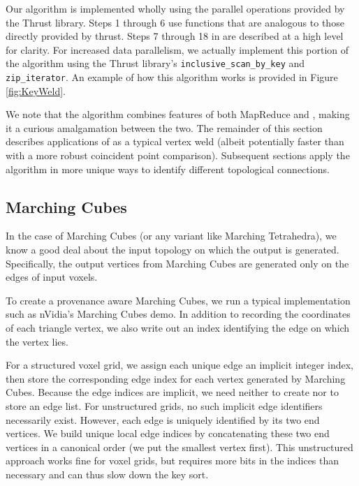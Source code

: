 \documentclass[10pt,journal,cspaper,compsoc]{IEEEtran}
\begin{document}
Our  algorithm is implemented wholly using the parallel
operations provided by the Thrust library.  Steps 1 through 6 use functions
that are analogous to those directly provided by thrust.
Steps 7 through 18 in  are described at a high level for clarity. For increased data parallelism, we actually implement this portion of the algorithm using the Thrust library's \texttt{inclusive\_scan\_by\_key} and \texttt{zip\_iterator}. An example of how this algorithm works is provided in Figure \ref{fig:KeyWeld}.

We note that the  algorithm combines features of both
MapReduce and , making it a curious amalgamation between
the two.  The remainder of this section describes applications of
 as a typical vertex weld (albeit potentially faster than
 with a more robust coincident point comparison).
Subsequent sections apply the  algorithm in more
unique ways to identify different topological connections.

\subsection{Marching Cubes}
\label{sec:MarchingCubes}

In the case of Marching Cubes (or any variant like Marching Tetrahedra), we
know a good deal about the input topology on which the output is
generated. Specifically, the output vertices from Marching Cubes are
generated only on the edges of input voxels.

To create a provenance aware Marching Cubes, we run a typical
implementation such as nVidia's Marching Cubes demo.  In addition to
recording the coordinates of each triangle vertex, we also write out an
index identifying the edge on which the vertex lies.

For a structured voxel grid, we assign each unique edge an implicit integer
index, then store the corresponding edge index for each vertex generated by
Marching Cubes.  Because the edge indices are implicit, we need neither to
create nor to store an edge list.  For unstructured grids, no such implicit
edge identifiers necessarily exist.  However, each edge is uniquely
identified by its two end vertices.  We build unique local edge indices by
concatenating these two end vertices in a canonical order (we put the
smallest vertex first).  This unstructured approach works fine for voxel
grids, but requires more bits in the indices than necessary and can thus
slow down the key sort.
\end{document}
